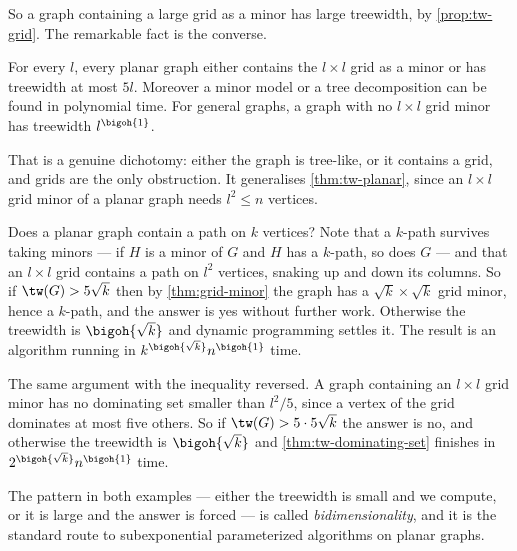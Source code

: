 So a graph containing a large grid as a minor has large treewidth, by
\cref{prop:tw-grid}. The remarkable fact is the converse.

\begin{theorem}
\label{thm:grid-minor}
For every $l$, every planar graph either contains the $l \times l$ grid as a
minor or has treewidth at most $5l$. Moreover a minor model or a tree
decomposition can be found in polynomial time. For general graphs, a graph with
no $l \times l$ grid minor has treewidth $l^{\bigoh{1}}$.
\end{theorem}

That is a genuine dichotomy: either the graph is tree-like, or it contains a
grid, and grids are the only obstruction. It generalises
\cref{thm:tw-planar}, since an $l \times l$ grid minor of a planar graph needs
$l^2 \le n$ vertices.

\begin{example}\label{ex:planar-k-path}
Does a planar graph contain a path on $k$ vertices? Note that a $k$-path
survives taking minors --- if $H$ is a minor of $G$ and $H$ has a $k$-path, so
does $G$ --- and that an $l \times l$ grid contains a path on $l^2$ vertices,
snaking up and down its columns. So if $\tw(G) > 5\sqrt k$ then by
\cref{thm:grid-minor} the graph has a $\sqrt k \times \sqrt k$ grid minor,
hence a $k$-path, and the answer is yes without further work. Otherwise the
treewidth is $\bigoh{\sqrt k}$ and dynamic programming settles it. The result is
an algorithm running in $k^{\bigoh{\sqrt k}} n^{\bigoh{1}}$ time.
\end{example}

\begin{example}\label{ex:planar-k-dominating}
The same argument with the inequality reversed. A graph containing an
$l \times l$ grid minor has no dominating set smaller than $l^2/5$, since a
vertex of the grid dominates at most five others. So if $\tw(G) > 5\cdot
5\sqrt k$ the answer is no, and otherwise the treewidth is $\bigoh{\sqrt k}$
and \cref{thm:tw-dominating-set} finishes in $2^{\bigoh{\sqrt k}} n^{\bigoh{1}}$
time.
\end{example}

The pattern in both examples --- either the treewidth is small and we compute,
or it is large and the answer is forced --- is called \emph{bidimensionality},
and it is the standard route to subexponential parameterized algorithms on
planar graphs.

